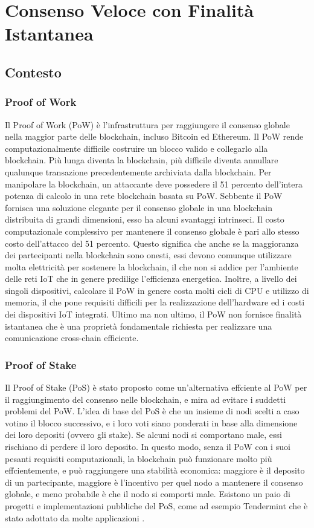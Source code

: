 \section{Consenso Veloce con Finalità Istantanea}

\subsection{Contesto}

\subsubsection{Proof of Work}
Il Proof of Work (PoW) è l'infrastruttura per raggiungere il consenso globale nella maggior parte delle blockchain, incluso Bitcoin ed Ethereum. Il PoW rende computazionalmente difficile costruire un blocco valido e collegarlo alla blockchain. Più lunga diventa la blockchain, più difficile diventa annullare qualunque transazione precedentemente archiviata dalla blockchain. Per manipolare la blockchain, un attaccante deve possedere il 51 percento dell'intera potenza di calcolo in una rete blockchain basata su PoW.
Sebbente il PoW fornisca una soluzione elegante per il consenso globale in una blockchain distribuita di grandi dimensioni, esso ha alcuni svantaggi intrinseci. Il costo computazionale complessivo per mantenere il consenso globale è pari allo stesso costo dell'attacco del 51 percento. Questo significa che anche se la maggioranza dei partecipanti nella blockchain sono onesti, essi devono comunque utilizzare molta elettricità per sostenere la blockchain, il che non si addice per l'ambiente delle reti IoT che in genere predilige l'efficienza energetica. Inoltre, a livello dei singoli dispositivi, calcolare il PoW in genere costa molti cicli di CPU e utilizzo di memoria, il che pone requisiti difficili per la realizzazione dell'hardware ed i costi dei dispositivi IoT integrati. Ultimo ma non ultimo, il PoW non fornisce finalità istantanea che è una proprietà fondamentale richiesta per realizzare una comunicazione cross-chain efficiente.

\subsubsection{Proof of Stake}
Il Proof of Stake (PoS) è stato proposto come un'alternativa effciente al PoW per il raggiungimento del consenso nelle blockchain, e mira ad evitare i suddetti problemi del PoW. L'idea di base del PoS è che un insieme di nodi scelti a caso votino il blocco successivo, e i loro voti siano ponderati in base alla dimensione dei loro depositi (ovvero gli stake). Se alcuni nodi si comportano male, essi rischiano di perdere il loro deposito. In questo modo, senza il PoW con i suoi pesanti requisiti computazionali, la blockchain può funzionare molto più effcientemente, e può raggiungere una stabilità economica: maggiore è il deposito di un partecipante, maggiore è l'incentivo per quel nodo a mantenere il consenso globale, e meno probabile è che il nodo si comporti male. Esistono un paio di progetti e implementazioni pubbliche del PoS, come ad esempio Tendermint \cite{c32} che è stato adottato da molte applicazioni \cite{c33}.

